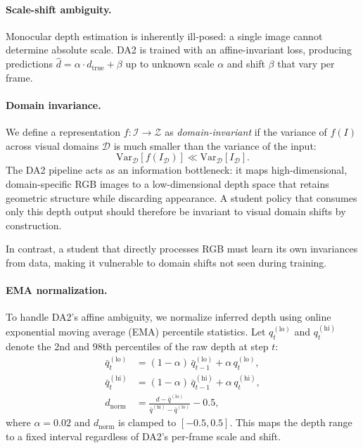 \documentclass[10pt,twocolumn]{article}
\newcommand{\Var}{\mathrm{Var}}
\begin{document}
\paragraph{Scale-shift ambiguity.}
Monocular depth estimation is inherently ill-posed: a single image
cannot determine absolute scale.  DA2 is trained with an
affine-invariant loss, producing predictions
$\hat{d} = \alpha \cdot d_{\text{true}} + \beta$ up to unknown
scale $\alpha$ and shift $\beta$ that vary per frame.

\paragraph{Domain invariance.}
We define a representation $f: \mathcal{I} \to \mathcal{Z}$ as
\emph{domain-invariant} if the variance of $f(I)$ across visual
domains $\mathcal{D}$ is much smaller than the variance of the
input:
\begin{equation}
  \Var_{\mathcal{D}}\!\left[f(I_\mathcal{D})\right]
  \ll
  \Var_{\mathcal{D}}\!\left[I_\mathcal{D}\right].
  \label{eq:domain_inv}
\end{equation}
The DA2 pipeline acts as an information bottleneck: it maps
high-dimensional, domain-specific RGB images to a low-dimensional
depth space that retains geometric structure while discarding
appearance.  A student policy that consumes only this depth output
should therefore be invariant to visual domain shifts by
construction.

In contrast, a student that directly processes RGB must learn its
own invariances from data, making it vulnerable to domain shifts
not seen during training.

\paragraph{EMA normalization.}
\label{sec:depth_norm}
To handle DA2's affine ambiguity, we normalize inferred depth using
online exponential moving average (EMA) percentile statistics.  Let
$q_{t}^{(\text{lo})}$ and $q_{t}^{(\text{hi})}$ denote the 2nd and
98th percentiles of the raw depth at step $t$:
\begin{align}
  \bar{q}^{(\text{lo})}_{t} &= (1 - \alpha)\,\bar{q}^{(\text{lo})}_{t-1} + \alpha\, q_{t}^{(\text{lo})}, \\
  \bar{q}^{(\text{hi})}_{t} &= (1 - \alpha)\,\bar{q}^{(\text{hi})}_{t-1} + \alpha\, q_{t}^{(\text{hi})}, \\
  d_{\text{norm}} &= \frac{d - \bar{q}^{(\text{lo})}}{\bar{q}^{(\text{hi})} - \bar{q}^{(\text{lo})}} - 0.5,
  \label{eq:ema_norm}
\end{align}
where $\alpha = 0.02$ and $d_{\text{norm}}$ is clamped to
$[-0.5, 0.5]$.  This maps the depth range to a fixed interval
regardless of DA2's per-frame scale and shift.
\end{document}
